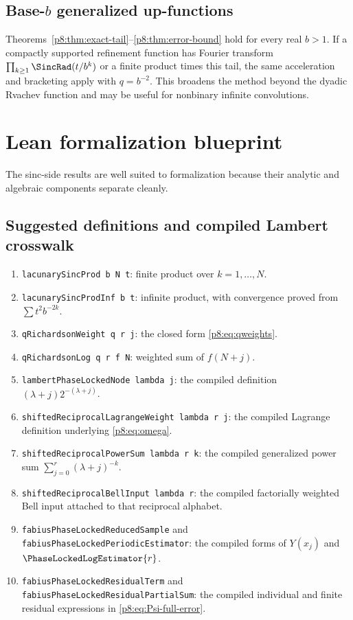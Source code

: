 \documentclass[11pt]{article}
\numberwithin{equation}{section}
\theoremstyle{definition}
\theoremstyle{remark}
\begin{document}
\subsection{Base-\texorpdfstring{$b$}{b} generalized up-functions}

Theorems~\ref{p8:thm:exact-tail}--\ref{p8:thm:error-bound} hold for every real $b>1$. If a compactly supported refinement function has Fourier transform
\(
\prod_{k\ge1}\SincRad(t/b^k)
\)
or a finite product times this tail, the same acceleration and bracketing apply with $q=b^{-2}$. This broadens the method beyond the dyadic Rvachev function and may be useful for nonbinary infinite convolutions.

\section{Lean formalization blueprint}
\label{p8:sec:lean}

The sinc-side results are well suited to formalization because their analytic and algebraic components separate cleanly.

\subsection{Suggested definitions and compiled Lambert crosswalk}

\begin{enumerate}
\item \texttt{lacunarySincProd b N t}: finite product over $k=1,\ldots,N$.
\item \texttt{lacunarySincProdInf b t}: infinite product, with convergence proved from $\sum t^2b^{-2k}$.
\item \texttt{qRichardsonWeight q r j}: the closed form \cref{p8:eq:qweights}.
\item \texttt{qRichardsonLog q r f N}: weighted sum of $f(N+j)$.
\item \texttt{lambertPhaseLockedNode lambda j}: the compiled definition
      $(\lambda+j)2^{-(\lambda+j)}$.
\item \texttt{shiftedReciprocalLagrangeWeight lambda r j}: the compiled
      Lagrange definition underlying \cref{p8:eq:omega}.
\item \texttt{shiftedReciprocalPowerSum lambda r k}: the compiled generalized
      power sum $\sum_{j=0}^{r}(\lambda+j)^{-k}$.
\item \texttt{shiftedReciprocalBellInput lambda r}: the compiled
      factorially weighted Bell input attached to that reciprocal alphabet.
\item \texttt{fabiusPhaseLockedReducedSample} and
      \texttt{fabiusPhaseLockedPeriodicEstimator}: the compiled forms of
      $Y(x_j)$ and $\PhaseLockedLogEstimator{r}$.
\item \texttt{fabiusPhaseLockedResidualTerm} and
      \texttt{fabiusPhaseLockedResidualPartialSum}: the compiled individual
      and finite residual expressions in \eqref{p8:eq:Psi-full-error}.
\end{enumerate}
\end{document}
